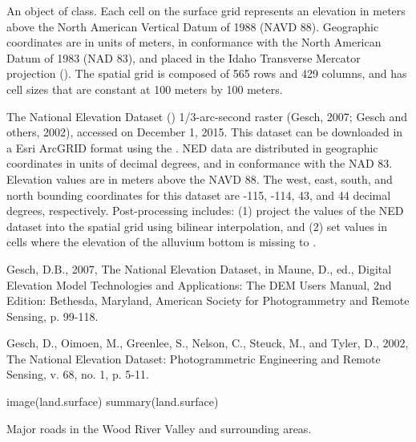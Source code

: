 \documentclass[letterpaper]{book}
\begin{document}
%
\begin{Format}
An object of  class.
Each cell on the surface grid represents an elevation in meters above the North American Vertical Datum of 1988 (NAVD 88).
Geographic coordinates are in units of meters, in conformance with the North American Datum of 1983 (NAD 83), and placed in the
Idaho Transverse Mercator projection ().
The spatial grid is composed of 565 rows and 429 columns, and has cell sizes that are constant at 100 meters by 100 meters.
\end{Format}
%
\begin{Source}\relax
The National Elevation Dataset () 1/3-arc-second raster (Gesch, 2007; Gesch and others, 2002), accessed on December 1, 2015.
This dataset can be downloaded in a Esri ArcGRID format using the .
NED data are distributed in geographic coordinates in units of decimal degrees, and in conformance with the NAD 83.
Elevation values are in meters above the NAVD 88.
The west, east, south, and north bounding coordinates for this dataset are -115, -114, 43, and 44 decimal degrees, respectively.
Post-processing includes:
(1) project the values of the NED dataset into the  spatial grid using bilinear interpolation, and
(2) set values in cells where the elevation of the alluvium bottom is missing to .
\end{Source}
%
\begin{References}\relax
Gesch, D.B., 2007, The National Elevation Dataset, in Maune, D., ed., Digital Elevation Model Technologies and Applications: The DEM Users Manual, 2nd Edition: Bethesda, Maryland, American Society for Photogrammetry and Remote Sensing, p. 99-118.

Gesch, D., Oimoen, M., Greenlee, S., Nelson, C., Steuck, M., and Tyler, D., 2002, The National Elevation Dataset: Photogrammetric Engineering and Remote Sensing, v. 68, no. 1, p. 5-11.
\end{References}
%
\begin{Examples}
\begin{ExampleCode}
image(land.surface)
summary(land.surface)
\end{ExampleCode}
\end{Examples}
%
\begin{Description}\relax
Major roads in the Wood River Valley and surrounding areas.
\end{Description}
\end{document}
